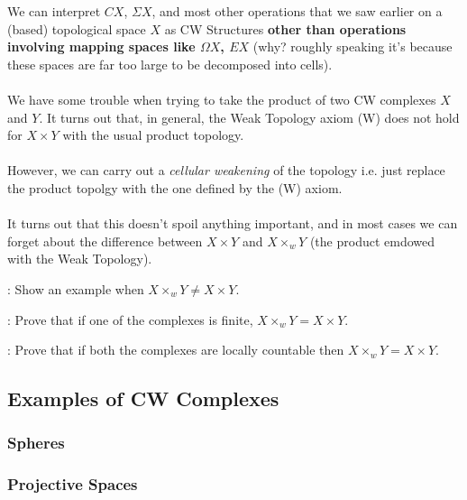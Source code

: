 \documentclass[11pt]{article}
\begin{document}
We can interpret $CX$, $\Sigma X$, and most other operations that we saw earlier on a (based) topological space $X$ as CW Structures \textbf{other than operations involving mapping spaces like $\Omega X$, $EX$} (why? roughly speaking it's because these spaces are far too large to be decomposed into cells).
\\
\\
We have some trouble when trying to take the product of two CW complexes $X$ and $Y$. It turns out that, in general, the Weak Topology axiom (W) does not hold for $X \times Y$ with the usual product topology.
\\
\\
However, we can carry out a \emph{cellular weakening} of the topology i.e. just replace the product topolgy with the one defined by the (W) axiom.
\\
\\
It turns out that this doesn't spoil anything important, and in most cases we can forget about the difference between $X \times Y$ and $X \times_{w} Y$ (the product emdowed with the Weak Topology).

\begin{dottedbox}
  \cite[Section 5.3, Exercise 9]{FomenkoFuchs16}: Show an example when $X \times_w Y \neq X \times Y$.
\end{dottedbox}


\begin{dottedbox}
  \cite[Section 5.3, Exercise 10]{FomenkoFuchs16}: Prove that if one of the complexes is finite, $X \times_w Y = X \times Y$.
\end{dottedbox}



\begin{dottedbox}
  \cite[Section 5.3, Exercise 11]{FomenkoFuchs16}: Prove that if both the complexes are locally countable then $X \times_w Y = X \times Y$.
\end{dottedbox}

\vskip 0.5cm
\subsection{Examples of CW Complexes}

\subsubsection{Spheres}

\subsubsection{Projective Spaces}
\end{document}

